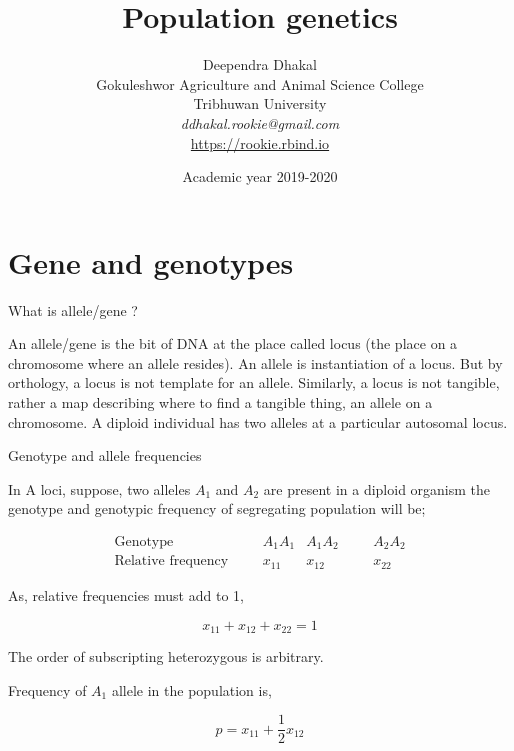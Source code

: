 \documentclass[11pt,dvipsnames,ignorenonframetext,aspectratio=169]{beamer}
\title[]{Population genetics}
\author[
        Deependra Dhakal\\
Gokuleshwor Agriculture and Animal Science College\\
Tribhuwan University\\
\textit{ddhakal.rookie@gmail.com}\\
\url{https://rookie.rbind.io}
    ]{Deependra Dhakal\\
Gokuleshwor Agriculture and Animal Science College\\
Tribhuwan University\\
\textit{ddhakal.rookie@gmail.com}\\
\url{https://rookie.rbind.io}}
\date[
      Academic year 2019-2020
  ]{
      Academic year 2019-2020
        }
\begin{document}
  \begin{frame}[plain]
  \titlepage
  \end{frame}



\hypertarget{gene-and-genotypes}{%
\section{Gene and genotypes}\label{gene-and-genotypes}}

\begin{frame}{What is allele/gene ?}
\protect\hypertarget{what-is-allelegene}{}

An allele/gene is the bit of DNA at the place called locus (the place on
a chromosome where an allele resides). An allele is instantiation of a
locus. But by orthology, a locus is not template for an allele.
Similarly, a locus is not tangible, rather a map describing where to
find a tangible thing, an allele on a chromosome. A diploid individual
has two alleles at a particular autosomal locus.

\end{frame}

\begin{frame}{Genotype and allele frequencies}
\protect\hypertarget{genotype-and-allele-frequencies}{}

In A loci, suppose, two alleles \(A_1\) and \(A_2\) are present in a
diploid organism the genotype and genotypic frequency of segregating
population will be;

\[
\begin{aligned}
\textrm{Genotype} \hspace{20pt} & A_1A_1 & A_1A_2 \hspace{20pt} & A_2A_2 \\
\textrm{Relative frequency} \hspace{20pt} & x_{11} & x_{12} \hspace{20pt} & x_{22}
\end{aligned}
\]

As, relative frequencies must add to 1,

\[
x_{11} + x_{12} + x_{22} = 1
\]

The order of subscripting heterozygous is arbitrary.

Frequency of \(A_1\) allele in the population is,

\[
p = x_{11} + \frac{1}{2}x_{12}
\]

\end{frame}
\end{document}
